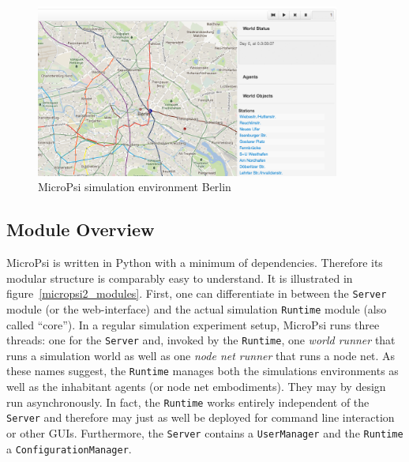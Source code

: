 \begin{figure}[h]
  \centering
    \includegraphics[width=10cm]{graphics/mp2_berlin}
  \caption{MicroPsi simulation environment Berlin}
  \label{mp2_berlin}
\end{figure}

        \subsection{Module Overview}
MicroPsi is written in Python with a minimum of dependencies. Therefore its  modular structure is comparably easy to understand. It is illustrated in figure~\ref{micropsi2_modules}. First, one can differentiate in between the \texttt{Server} module (or the web-interface) and the actual simulation \texttt{Runtime} module (also called ``core''). In a regular simulation experiment setup, MicroPsi runs three threads: one for the \texttt{Server} and, invoked by the \texttt{Runtime}, one \emph{world runner} that runs a simulation world as well as one \emph{node net runner} that runs a node net. As these names suggest, the \texttt{Runtime} manages both the simulations environments as well as the inhabitant agents (or node net embodiments). They may by design run asynchronously. In fact, the \texttt{Runtime} works entirely independent of the \texttt{Server} and therefore may just as well be deployed for command line interaction or other GUIs. Furthermore, the \texttt{Server} contains a \texttt{UserManager} and the \texttt{Runtime} a \texttt{ConfigurationManager}.~\cite{conf/agi/Bach12}
\\          
          

